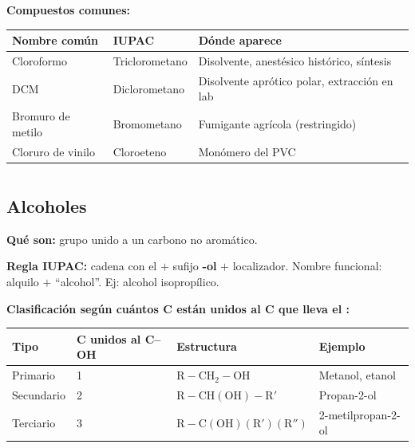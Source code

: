\textbf{Compuestos comunes:}

\begin{longtable}{L{4.0cm} L{5.0cm} L{8.5cm}}
\toprule
\textbf{Nombre común} & \textbf{IUPAC} & \textbf{Dónde aparece} \\
\midrule\endhead\bottomrule\endlastfoot
Cloroformo        & Triclorometano  & Disolvente, anestésico histórico, síntesis \\
DCM               & Diclorometano   & Disolvente aprótico polar, extracción en lab \\
Bromuro de metilo & Bromometano     & Fumigante agrícola (restringido) \\
Cloruro de vinilo & Cloroeteno      & Monómero del PVC \\
\end{longtable}

\newpage


{}
\section*{\centering\fontsize{12}{18}}

\subsection*{\textcolor{blueunam}{Alcoholes}}

\textbf{Qué son:} grupo  unido a un carbono no aromático.

\textbf{Regla IUPAC:} cadena con el  $+$ sufijo \textbf{-ol} $+$ localizador.
Nombre funcional: alquilo $+$ ``alcohol''. Ej: alcohol isopropílico.

\textbf{Clasificación según cuántos C están unidos al C que lleva el :}

\begin{center}
\renewcommand{\arraystretch}{1.4}
\begin{longtable}{C{2.5cm} C{3.5cm} L{4.5cm} C{3.5cm}}
\toprule
\textbf{Tipo} & \textbf{C unidos al C--OH} & \textbf{Estructura} & \textbf{Ejemplo} \\
\midrule\endhead\bottomrule\endlastfoot
Primario   & 1 & $\mathrm{R{-}CH_2{-}OH}$    & Metanol, etanol \\
Secundario & 2 & $\mathrm{R{-}CH(OH){-}R'}$ & Propan-2-ol \\
Terciario  & 3 & $\mathrm{R{-}C(OH)(R')(R'')}$ & 2-metilpropan-2-ol \\
\end{longtable}
\end{center}

